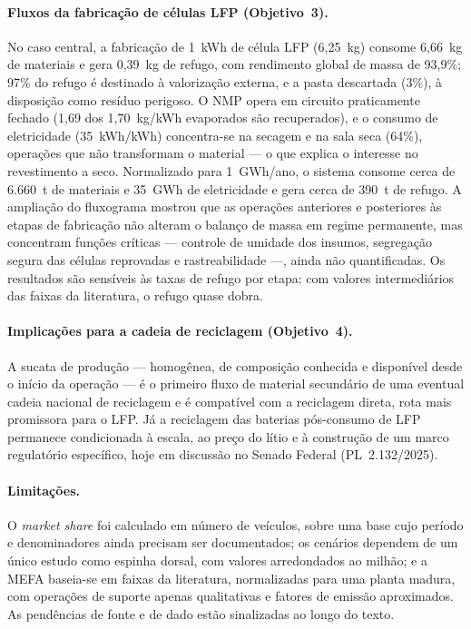 \paragraph{Fluxos da fabricação de células LFP (Objetivo~3).}
No caso central, a fabricação de 1~kWh de célula LFP (6,25~kg) consome 6,66~kg de
materiais e gera 0,39~kg de refugo, com rendimento global de massa de 93,9\%; 97\%
do refugo é destinado à valorização externa, e a pasta descartada (3\%), à
disposição como resíduo perigoso. O NMP opera em circuito praticamente fechado
(1,69 dos 1,70~kg/kWh evaporados são recuperados), e o consumo de eletricidade
(35~kWh/kWh) concentra-se na secagem e na sala seca (64\%), operações que não
transformam o material — o que explica o interesse no revestimento a seco.
Normalizado para 1~GWh/ano, o sistema consome cerca de 6.660~t de materiais e
35~GWh de eletricidade e gera cerca de 390~t de refugo. A ampliação do fluxograma
mostrou que as operações anteriores e posteriores às etapas de fabricação não
alteram o balanço de massa em regime permanente, mas concentram funções críticas
— controle de umidade dos insumos, segregação segura das células reprovadas e
rastreabilidade —, ainda não quantificadas. Os resultados são sensíveis às taxas
de refugo por etapa: com valores intermediários das faixas da literatura, o refugo
quase dobra.

\paragraph{Implicações para a cadeia de reciclagem (Objetivo~4).}
A sucata de produção — homogênea, de composição conhecida e disponível desde o
início da operação — é o primeiro fluxo de material secundário de uma eventual
cadeia nacional de reciclagem e é compatível com a reciclagem direta, rota mais
promissora para o LFP. Já a reciclagem das baterias pós-consumo de LFP permanece
condicionada à escala, ao preço do lítio e à construção de um marco regulatório
específico, hoje em discussão no Senado Federal (PL~2.132/2025).

\paragraph{Limitações.}
O \textit{market share} foi calculado em número de veículos, sobre uma base cujo
período e denominadores ainda precisam ser documentados; os cenários dependem de
um único estudo como espinha dorsal, com valores arredondados ao milhão; e a MEFA
baseia-se em faixas da literatura, normalizadas para uma planta madura, com
operações de suporte apenas qualitativas e fatores de emissão aproximados. As
pendências de fonte e de dado estão sinalizadas ao longo do texto.

